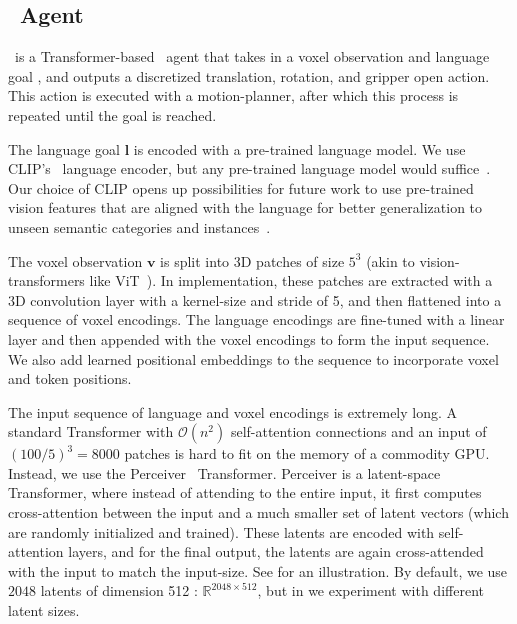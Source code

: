 \subsection{\model~Agent} \label{sec:peract}
\vspace{-0.2cm}
\model~is a Transformer-based~\citep{vaswani2017attention} agent that takes in a voxel observation and language goal , and outputs a discretized translation, rotation, and gripper open action. This action is executed with a motion-planner, after which this process is repeated until the goal is reached.

The language goal $\mathbf{l}$ is encoded with a pre-trained language model. 
We use CLIP's~\citep{radfordLearningTransferableVisual2021} language encoder, but any pre-trained language model would suffice~\citep{ahn2022can,lynch2020grounding}. Our choice of CLIP opens up possibilities for future work to use pre-trained vision features that are aligned with the language for better generalization to unseen semantic categories and instances~\citep{cliport}. 

The voxel observation $\mathbf{v}$ is split into 3D patches of size $5^3$ (akin to vision-transformers like ViT~\citep{dosovitskiy2020image}). In implementation, these  patches are extracted with a 3D convolution layer with a kernel-size and stride of 5, and then flattened into a sequence of voxel encodings. The language encodings are fine-tuned with a linear layer and then appended with the voxel encodings to form the input sequence. We also add learned positional embeddings to the sequence to incorporate voxel and token positions.

The input sequence of language and voxel encodings is extremely long. 
A standard Transformer with $\mathcal{O}(n^2)$ self-attention connections and an input of  $(100/5)^3 = 8000$ patches is hard to fit on the memory of a commodity GPU.  
Instead, we use the Perceiver~\citep{jaegle2021perceiver} Transformer. Perceiver is a latent-space Transformer, where instead of attending to the entire input, it first computes cross-attention between the input and a much smaller set of latent vectors (which are randomly initialized and trained). These latents are encoded with self-attention layers, and for the final output, the latents are again cross-attended with the input to match the input-size. See  for an illustration. By default, we use $2048$ latents of dimension 512 : $\mathbb{R}^{2048 \times 512}$, but in  we experiment with different latent sizes. 

